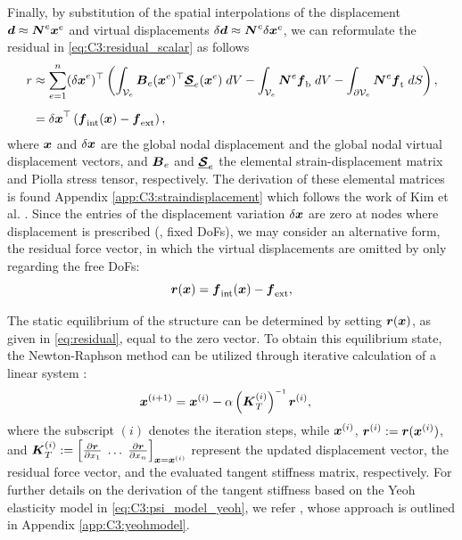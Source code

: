 Finally, by substitution of the spatial interpolations of the displacement ${\boldsymbol{d}} \approx {\boldsymbol{N}}^e {\boldsymbol{x}}^e$ and virtual displacements $\delta {\boldsymbol{d}} \approx {\boldsymbol{N}}^e\delta {\boldsymbol{x}}^e$, we can reformulate the residual in \eqref{eq:C3:residual_scalar} as follows
%
\begin{align}
r & \approx \sum_{e=1}^{n} ({\delta {\boldsymbol{x}}}^e)^\top \left(\int_{\mathcal{V}_e} {\boldsymbol{B}}_e({\boldsymbol{x}}^e)^\top \underline{\boldsymbol{\mathcal{S}}}_e({\boldsymbol{x}}^e) \; dV  - \int_{\mathcal{V}_e} {\boldsymbol{N}}^{e} {\boldsymbol{f}}_{\textrm{b}} \; dV  - \int_{\partial \mathcal{V}_e} {\boldsymbol{N}}^{e} {\boldsymbol{f}}_{\textrm{t}} \; dS \right), \notag \\[0.5em]
& = {\delta {\boldsymbol{x}}}^\top \left( {\boldsymbol{f}}_{\textrm{int}}({\boldsymbol{x}}) - {\boldsymbol{f}}_{\textrm{ext}} \right),
\end{align}
%
where ${\boldsymbol{x}}$ and $\delta {\boldsymbol{x}}$ are the global nodal displacement and the global nodal virtual displacement vectors, and ${\boldsymbol{B}}_e$ and $\underline{\boldsymbol{\mathcal{S}}}_e$ the elemental strain-displacement matrix and Piolla stress tensor, respectively. The derivation of these elemental matrices is found Appendix \ref{app:C3:straindisplacement} which follows the work of Kim et al. \cite{Kim2018}. Since the entries of the displacement variation ${\delta {\boldsymbol{x}}}$ are zero at nodes where displacement is prescribed (\ie, fixed DoFs), we may consider an alternative form, the residual force vector, in which the virtual displacements are omitted by only regarding the free DoFs:
%
\begin{equation}
{\boldsymbol{r}}({\boldsymbol{x}}) = {\boldsymbol{f}}_{\textrm{int}}({\boldsymbol{x}}) - {\boldsymbol{f}}_{\textrm{ext}},
\label{eq:residual}
\end{equation}
%

The static equilibrium of the structure can be determined by setting ${\boldsymbol{r}}({\boldsymbol{x}})$, as given in \eqref{eq:residual}, equal to the zero vector. To obtain this equilibrium state, the Newton-Raphson method can be utilized through iterative calculation of a linear system \cite{Gain2013Dec,Kim2018,Holzapfel2002}:
%
\begin{align}
\x^{(i+1)} & = \x^{(i)} -\alpha \left(\KB_T^{(i)}\right)\inv \rB^{(i)},
\end{align}
%
where the subscript $(i)$ denotes the iteration steps, while ${\boldsymbol{x}}^{(i)}$, ${\boldsymbol{r}}^{(i)} := {\boldsymbol{r}}({\boldsymbol{x}}^{(i)})$, and ${\boldsymbol{K}}_T^{(i)}:=\left[\tfrac{\partial {\boldsymbol{r}}}{\partial x_1} \; \hdots \; \tfrac{\partial {\boldsymbol{r}}}{\partial x_n} \right]_{{\boldsymbol{x}} = {\boldsymbol{x}}^{(i)}}$ represent the updated displacement vector, the residual force vector, and the evaluated tangent stiffness matrix, respectively. For further details on the derivation of the tangent stiffness based on the Yeoh elasticity model in \eqref{eq:C3:psi_model_yeoh}, we refer \cite{Renaud2011}, whose approach is outlined in Appendix \ref{app:C3:yeohmodel}.

